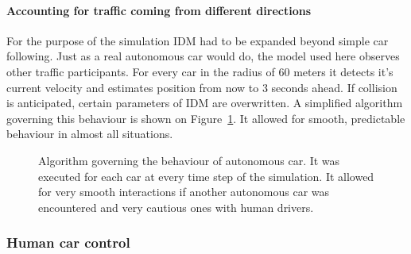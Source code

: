\documentclass[11pt,english,twoside]{article}
\begin{document}
\paragraph{Accounting for traffic coming from different directions} For the purpose of the simulation IDM had to be expanded beyond simple car following. Just as a real autonomous car would do, the model used here observes other traffic participants. For every car in the radius of 60 meters it detects it's current velocity and estimates position from now to 3 seconds ahead. 
If collision is anticipated, certain parameters of IDM are overwritten. A simplified algorithm governing this behaviour is shown on Figure~\ref{fig:idm_upgrade}. It allowed for smooth, predictable behaviour in almost all situations. 


\begin{figure}[!] %
\caption{Algorithm governing the behaviour of autonomous car. It was executed for each car at every time step of the simulation. It allowed for very smooth interactions if another autonomous car was encountered and very cautious ones with human drivers.}
\label{fig:idm_upgrade}
\end{figure} 


\subsubsection{Human car control}
\end{document}
